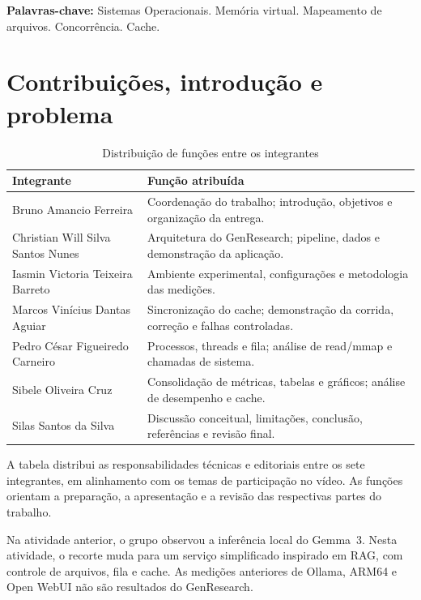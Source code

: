 \documentclass[12pt,a4paper]{article}
\newcommand{\secao}[1]{\clearpage\section{#1}}
\begin{document}
  \vspace{\baselineskip}
  \noindent\textbf{Palavras-chave:} Sistemas Operacionais. Memória virtual. Mapeamento de arquivos. Concorrência. Cache.

  \clearpage
  \thispagestyle{empty}
  \begin{singlespace}\small\tableofcontents\end{singlespace}

  \secao{Contribuições, introdução e problema}
  \begin{table}[H]
  \centering
  \caption{Distribuição de funções entre os integrantes}
  \label{tab:contribuicoes}
  \begin{singlespace}\small
  \begin{tabularx}{\textwidth}{>{\raggedright\arraybackslash}p{}X}
  \toprule\textbf{Integrante} & \textbf{Função atribuída}\\\midrule
  Bruno Amancio Ferreira & Coordenação do trabalho; introdução, objetivos e organização da entrega.\\
  Christian Will Silva Santos Nunes & Arquitetura do GenResearch; pipeline, dados e demonstração da aplicação.\\
  Iasmin Victoria Teixeira Barreto & Ambiente experimental, configurações e metodologia das medições.\\
  Marcos Vinícius Dantas Aguiar & Sincronização do cache; demonstração da corrida, correção e falhas controladas.\\
  Pedro César Figueiredo Carneiro & Processos, threads e fila; análise de read/mmap e chamadas de sistema.\\
  Sibele Oliveira Cruz & Consolidação de métricas, tabelas e gráficos; análise de desempenho e cache.\\
  Silas Santos da Silva & Discussão conceitual, limitações, conclusão, referências e revisão final.\\\bottomrule
  \end{tabularx}
  \end{singlespace}
  \end{table}
  A tabela distribui as responsabilidades técnicas e editoriais entre os sete integrantes, em alinhamento com os temas de participação no vídeo. As funções orientam a preparação, a apresentação e a revisão das respectivas partes do trabalho.

  Na atividade anterior, o grupo observou a inferência local do Gemma~3. Nesta atividade, o recorte muda para um serviço simplificado inspirado em RAG, com controle de arquivos, fila e cache. As medições anteriores de Ollama, ARM64 e Open WebUI não são resultados do GenResearch.
\end{document}

